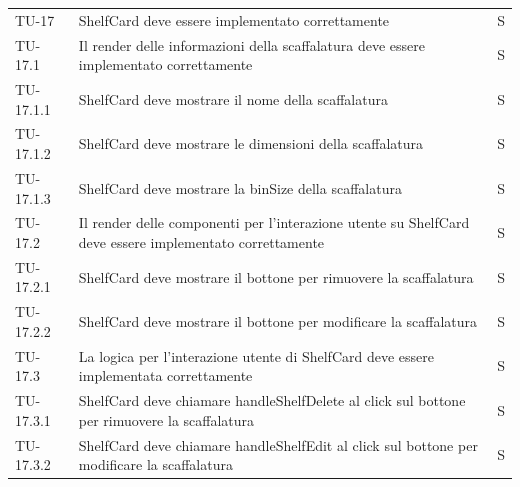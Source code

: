 \begin{xltabular}{0.9\textwidth}{X | p{0.6\textwidth} | p{0.1\textwidth} }
    TU-17 & ShelfCard deve essere implementato correttamente & S\\
    TU-17.1 & Il render delle informazioni della scaffalatura deve essere implementato correttamente & S\\
    TU-17.1.1 & ShelfCard deve mostrare il nome della scaffalatura & S\\
    TU-17.1.2 & ShelfCard deve mostrare le dimensioni della scaffalatura & S\\
    TU-17.1.3 & ShelfCard deve mostrare la binSize della scaffalatura & S\\
    TU-17.2 & Il render delle componenti per l'interazione utente su ShelfCard deve essere implementato correttamente & S\\
    TU-17.2.1 & ShelfCard deve mostrare il bottone per rimuovere la scaffalatura & S\\
    TU-17.2.2 & ShelfCard deve mostrare il bottone per modificare la scaffalatura & S\\
    TU-17.3 & La logica per l'interazione utente di ShelfCard deve essere implementata correttamente & S\\
    TU-17.3.1 & ShelfCard deve chiamare handleShelfDelete al click sul bottone per rimuovere la scaffalatura & S\\
    TU-17.3.2 & ShelfCard deve chiamare handleShelfEdit al click sul bottone per modificare la scaffalatura & S\\


\end{xltabular}
